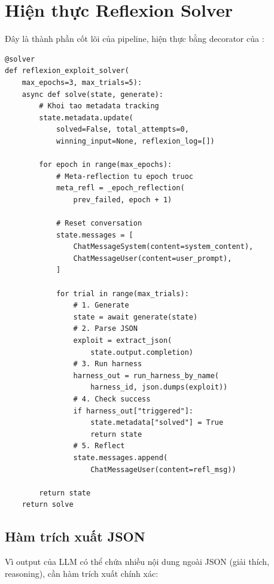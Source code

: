 \documentclass{nt521report}
\begin{document}
\section{Hiện thực Reflexion Solver}
\label{sec:solver-impl}

Đây là thành phần cốt lõi của pipeline, hiện thực bằng decorator  của :

\begin{lstlisting}[style=Python, caption={Reflexion Solver -- cấu trúc chính}, label={lst:solver}]
@solver
def reflexion_exploit_solver(
    max_epochs=3, max_trials=5):
    async def solve(state, generate):
        # Khoi tao metadata tracking
        state.metadata.update(
            solved=False, total_attempts=0,
            winning_input=None, reflexion_log=[])

        for epoch in range(max_epochs):
            # Meta-reflection tu epoch truoc
            meta_refl = _epoch_reflection(
                prev_failed, epoch + 1)

            # Reset conversation
            state.messages = [
                ChatMessageSystem(content=system_content),
                ChatMessageUser(content=user_prompt),
            ]

            for trial in range(max_trials):
                # 1. Generate
                state = await generate(state)
                # 2. Parse JSON
                exploit = extract_json(
                    state.output.completion)
                # 3. Run harness
                harness_out = run_harness_by_name(
                    harness_id, json.dumps(exploit))
                # 4. Check success
                if harness_out["triggered"]:
                    state.metadata["solved"] = True
                    return state
                # 5. Reflect
                state.messages.append(
                    ChatMessageUser(content=refl_msg))

        return state
    return solve
\end{lstlisting}

\subsection{Hàm trích xuất JSON}

Vì output của LLM có thể chứa nhiều nội dung ngoài JSON (giải thích, reasoning), cần hàm trích xuất chính xác:
\end{document}

